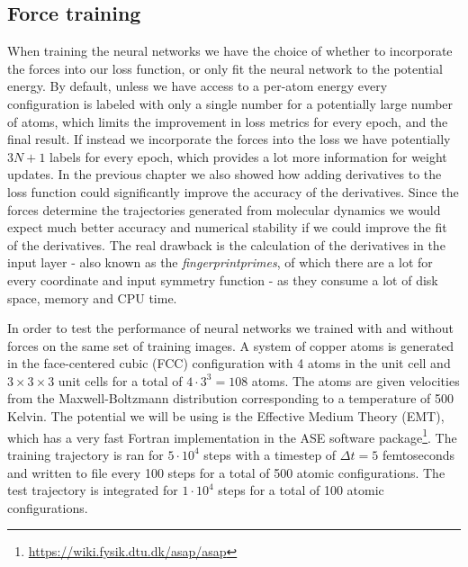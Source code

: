 \subsection{Force training}
When training the neural networks we have the choice of whether
to incorporate the forces into our loss function, or only fit
the neural network to the potential energy. By default, unless
we have access to a per-atom energy every configuration is labeled
with only a single number for a potentially large number of atoms,
which limits the improvement in loss metrics for every epoch,
and the final result. If instead we incorporate the forces into the
loss we have potentially $3N + 1$ labels for every epoch,
which provides a lot more information for weight updates.
In the previous chapter we also showed how adding derivatives to
the loss function could significantly improve the accuracy of the
derivatives. Since the forces determine the trajectories generated
from molecular dynamics we would expect much better
accuracy and numerical stability if we could improve the fit of
the derivatives.
The real drawback is the calculation of the derivatives in the input layer - 
also known as the \textit{fingerprintprimes},
of which there are a lot for every coordinate
and input symmetry function - as they consume a lot of disk space,
memory and CPU time.
\par
In order to test the performance of neural networks
we trained with and without forces on the same set of training images.
A system of copper atoms is generated in the face-centered cubic (FCC)
configuration with 4 atoms in the unit cell and $3 \times 3 \times 3$
unit cells for a total of $4 \cdot 3^3 = 108$ atoms. The
atoms are given velocities from the Maxwell-Boltzmann distribution
corresponding to a temperature of 500 Kelvin. The potential we will
be using is the Effective Medium Theory (EMT), which has a very
fast Fortran implementation in the ASE software package\footnote{
\url{https://wiki.fysik.dtu.dk/asap/asap}}.
The training trajectory is ran for $5 \cdot 10^4$ steps with
a timestep of $\Delta t = 5$ femtoseconds and written to file every 100 steps
for a total of 500 atomic configurations. The test trajectory is
integrated for $1 \cdot 10^4$ steps for a total of 100 atomic configurations.

